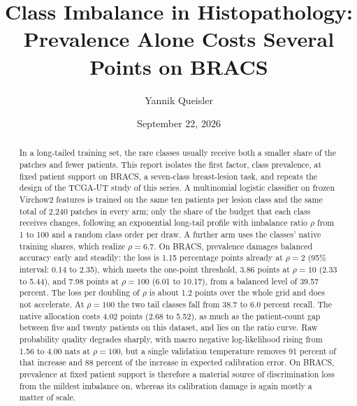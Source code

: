 \documentclass[11pt]{article}
\title{Class Imbalance in Histopathology:\\Prevalence Alone Costs Several Points on BRACS}
\author{Yannik Queisler}
\date{September 22, 2026}
\begin{document}
\raggedbottom
{}
\setlength{\emergencystretch}{2em}
\maketitle
\begin{abstract}
\noindent In a long-tailed training set, the rare classes usually receive both a smaller share of the patches and fewer patients. This report isolates the first factor, class prevalence, at fixed patient support on BRACS, a seven-class breast-lesion task, and repeats the design of the TCGA-UT study of this series. A multinomial logistic classifier on frozen Virchow2 features is trained on the same ten patients per lesion class and the same total of 2,240 patches in every arm; only the share of the budget that each class receives changes, following an exponential long-tail profile with imbalance ratio $\rho$ from 1 to 100 and a random class order per draw. A further arm uses the classes' native training shares, which realize $\rho=6.7$. On BRACS, prevalence damages balanced accuracy early and steadily: the loss is 1.15 percentage points already at $\rho=2$ (95\% interval: 0.14 to 2.35), which meets the one-point threshold, 3.86 points at $\rho=10$ (2.33 to 5.44), and 7.98 points at $\rho=100$ (6.01 to 10.17), from a balanced level of 39.57 percent. The loss per doubling of $\rho$ is about 1.2 points over the whole grid and does not accelerate. At $\rho=100$ the two tail classes fall from 38.7 to 6.0 percent recall. The native allocation costs 4.02 points (2.68 to 5.52), as much as the patient-count gap between five and twenty patients on this dataset, and lies on the ratio curve. Raw probability quality degrades sharply, with macro negative log-likelihood rising from 1.56 to 4.00 nats at $\rho=100$, but a single validation temperature removes 91 percent of that increase and 88 percent of the increase in expected calibration error. On BRACS, prevalence at fixed patient support is therefore a material source of discrimination loss from the mildest imbalance on, whereas its calibration damage is again mostly a matter of scale.
\end{abstract}
\end{document}
